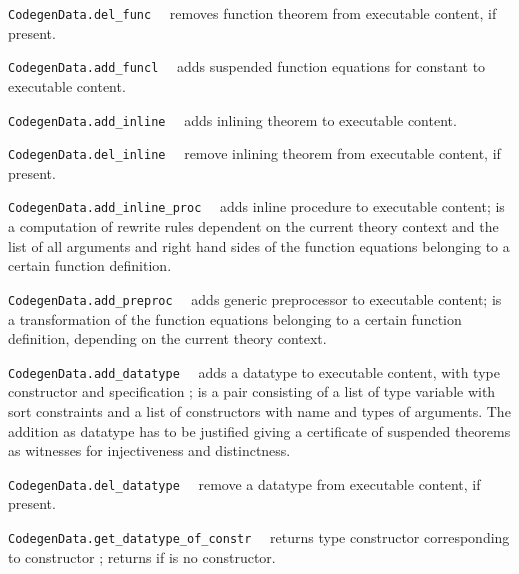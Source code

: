 \begin{isabellebody}
\begin{isamarkuptext}
\begin{description}
  \item \verb|CodegenData.del_func|~~ removes function
     theorem  from executable content, if present.

  \item \verb|CodegenData.add_funcl|~~ adds
     suspended function equations  for constant
      to executable content.

  \item \verb|CodegenData.add_inline|~~ adds
     inlining theorem  to executable content.

  \item \verb|CodegenData.del_inline|~~ remove
     inlining theorem  from executable content, if present.

  \item \verb|CodegenData.add_inline_proc|~~ adds
     inline procedure  to executable content;
      is a computation of rewrite rules dependent on
     the current theory context and the list of all arguments
     and right hand sides of the function equations belonging
     to a certain function definition.

  \item \verb|CodegenData.add_preproc|~~ adds
     generic preprocessor  to executable content;
      is a transformation of the function equations belonging
     to a certain function definition, depending on the
     current theory context.

  \item \verb|CodegenData.add_datatype|~~ adds
     a datatype to executable content, with type constructor
      and specification ;  is
     a pair consisting of a list of type variable with sort
     constraints and a list of constructors with name
     and types of arguments.  The addition as datatype
     has to be justified giving a certificate of suspended
     theorems as witnesses for injectiveness and distinctness.

  \item \verb|CodegenData.del_datatype|~~
     remove a datatype from executable content, if present.

  \item \verb|CodegenData.get_datatype_of_constr|~~
     returns type constructor corresponding to
     constructor ; returns 
     if  is no constructor.


\end{description}
\end{isamarkuptext}
\end{isabellebody}
